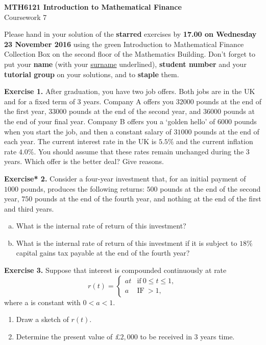 \documentclass[11pt,a4paper]{report}
\begin{document}
    \begin{center}
        \LARGE\textbf{MTH6121 Introduction to Mathematical Finance}\\
        Coursework 7
    \end{center}
    Please hand in your solution of the \textbf{starred} exercises by \textbf{17.00 on Wednesday 23 November 2016} using the green Introduction to Mathematical Finance Collection Box on the second floor of the Mathematics Building. Don’t forget to put your \textbf{name} (with your \underline{surname} underlined), \textbf{student number} and your \textbf{tutorial group} on your solutions, and to \textbf{staple} them.\par
    \textbf{Exercise 1.} After graduation, you have two job offers. Both jobs are in the UK and for a fixed term of $3$ years. Company A offers you $32000$ pounds at the end of the first year, $33000$ pounds at the end of the second year, and $36000$ pounds at the end of your final year. Company B offers you a ‘golden hello’ of $6000$ pounds when you start the job, and then a constant salary of $31000$ pounds at the end of each year. The current interest rate in the UK is $5.5\%$ and the current inflation rate $4.0\%$. You should assume that these rates remain unchanged during the $3$ years. Which offer is the better deal? Give reasons.\par
    \textbf{Exercise* 2.} Consider a four-year investment that, for an initial payment of $1000$ pounds, produces the following returns: $500$ pounds at the end of the second year, $750$ pounds at the end of the fourth year, and nothing at the end of the first and third years.
    \begin{enumerate}[(a)]
        \item  What is the internal rate of return of this investment?
        \item What is the internal rate of return of this investment if it is subject to $18\%$ capital gains tax payable at the end of the fourth year?
    \end{enumerate}
    \textbf{Exercise 3.} Suppose that interest is compounded continuously at rate
    $$
    r(t)
    =
    \begin{cases}
        at & \text{if}\ 0 \leq t \leq 1,\\
        a& \text{IF}\  > 1,
    \end{cases}
    $$
    where a is constant with $0 < a < 1$.
    \begin{enumerate}
        \item Draw a sketch of $r(t)$.
        \item Determine the present value of \pounds$2, 000$ to be received in $3$ years time.
    \end{enumerate}
\end{document}
